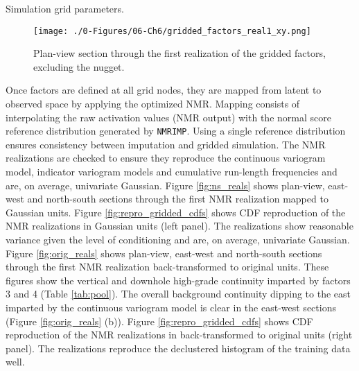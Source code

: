 \begin{table}[!htb]
    \centering
    \caption{Simulation grid parameters.}
    \resizebox{0.9\width}{!}{}
    \label{tab:simgrid}
\end{table}

\begin{figure}[htb!]
    \centering
    \texttt{[image: ./0-Figures/06-Ch6/gridded\_factors\_real1\_xy.png]}
    \caption{Plan-view section through the first realization of the gridded factors, excluding the nugget.}
    \label{fig:gridded_factors}
\end{figure}

Once factors are defined at all grid nodes, they are mapped from latent to observed space by applying the optimized \gls{NMR}. Mapping consists of interpolating the raw activation values (\gls{NMR} output) with the normal score reference distribution generated by \texttt{NMRIMP}. Using a single reference distribution ensures consistency between imputation and gridded simulation. The \gls{NMR} realizations are checked to ensure they reproduce the continuous variogram model, indicator variogram models and cumulative run-length frequencies and are, on average, univariate Gaussian. Figure \ref{fig:ns_reals} shows plan-view, east-west and north-south sections through the first \gls{NMR} realization mapped to Gaussian units. Figure \ref{fig:repro_gridded_cdfs} shows \gls{CDF} reproduction of the \gls{NMR} realizations in Gaussian units (left panel). The realizations show reasonable variance given the level of conditioning and are, on average, univariate Gaussian. Figure \ref{fig:orig_reals} shows plan-view, east-west and north-south sections through the first \gls{NMR} realization back-transformed to original units. These figures show the vertical and downhole high-grade continuity imparted by factors 3 and 4 (Table \ref{tab:pool}). The overall background continuity dipping to the east imparted by the continuous variogram model is clear in the east-west sections (Figure \ref{fig:orig_reals} (b)). Figure \ref{fig:repro_gridded_cdfs} shows \gls{CDF} reproduction of the \gls{NMR} realizations in back-transformed to original units (right panel). The realizations reproduce the declustered histogram of the training data well.



